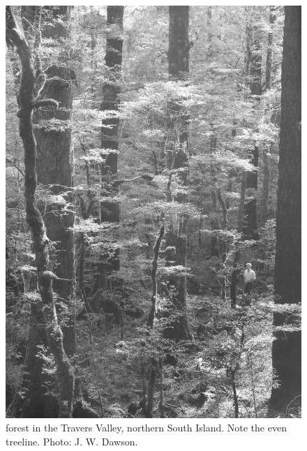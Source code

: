 \begin{figure}[htb]
\begin{minipage}[t]{0.489\textwidth}
    	\includegraphics[width=\textwidth]{graphics/figure72beech.jpg}
    	\caption[Nothofagus forest in the Travers Valley]{ forest in the Travers Valley, northern South Island.
    	Note the even treeline.
    	Photo: J. W. Dawson.}%
    	\label{fig:72beech}
	\end{minipage}
\end{figure}

